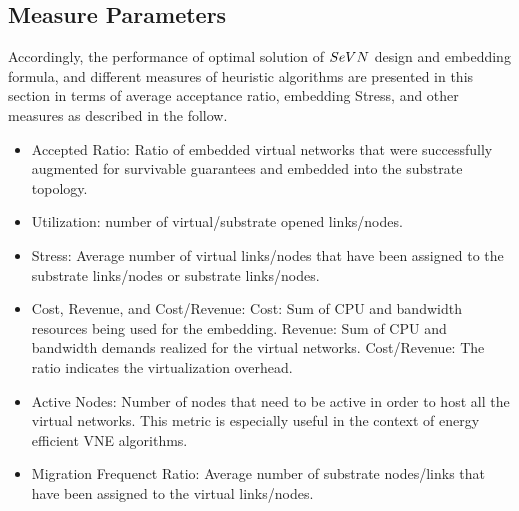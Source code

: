\subsection{Measure Parameters}


Accordingly, the performance of optimal solution of $SeVN$ design and embedding formula, and different measures of heuristic algorithms are presented in this section in terms of average acceptance ratio, embedding Stress, and other measures as described in the follow.
\begin{itemize}
  \item Accepted Ratio: Ratio of embedded virtual networks that were successfully augmented for survivable guarantees and embedded into the substrate topology.
  \item Utilization:  number of virtual/substrate opened links/nodes.
  \item Stress: Average number of virtual links/nodes that have been assigned to the substrate links/nodes or  substrate links/nodes.
  \item Cost, Revenue, and Cost/Revenue: Cost: Sum of CPU and bandwidth resources being used for the embedding. Revenue: Sum of CPU and bandwidth demands realized for the virtual networks. Cost/Revenue: The ratio indicates the virtualization overhead.
 \item Active Nodes: Number of nodes that need to be active in order to host all the virtual networks. This metric is especially useful in the context of energy efficient VNE algorithms.
 \item Migration Frequenct Ratio: Average number of substrate nodes/links that have been assigned to the virtual links/nodes.
\end{itemize}

